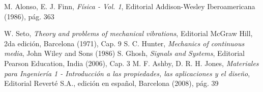 \documentclass[twoside,twocolumn,a4paper]{article}
\begin{document}
\newpage
\begin{thebibliography}{99} %


 M. Alonso, E. J. Finn, \textit{F\'isica - Vol. 1}, Editorial Addison-Wesley Iberoamericana (1986), p\'ag. 363

 W. Seto, \textit{Theory and problems of mechanical vibrations}, Editorial McGraw Hill, 2da edici\'on, Barcelona (1971), Cap. 9
 S. C. Hunter, \textit{Mechanics of continuous media}, John Wiley and Sons (1986)
 S. Ghosh, \textit{Signals and Systems}, Editorial Pearson Education, India (2006), Cap. 3
 M. F. Ashby, D. R. H. Jones, \textit{Materiales para Ingenier\'ia 1 - Introducci\'on a las propiedades, las aplicaciones y el dise\~no}, Editorial Revert\'e S.A., edici\'on en espa\~nol, Barcelona (2008), p\'ag. 39

 
\end{thebibliography}


\end{document}
